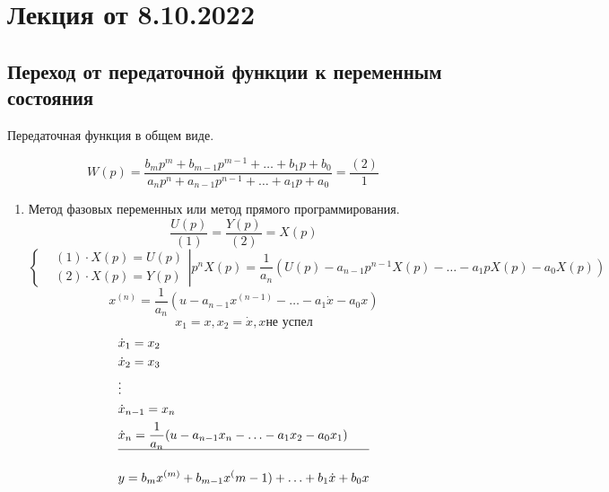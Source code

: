 \section{Лекция от 8.10.2022}
\subsection{Переход от передаточной функции к переменным состояния}
Передаточная функция в общем виде.\par
\[W(p) = \frac{b_mp^m + b_{m-1}p^{m-1} + \ldots + b_1p + b_0}
{a_np^n + a_{n-1}p^{n-1} + \ldots + a_1p +a_0} = \frac{(2)}{1}\]
\begin{enumerate}
	\item Метод фазовых переменных или метод прямого программирования.
		\[\frac{U(p)}{(1)} = \frac{Y(p)}{(2)} = X(p)\]
		\[\left\{\begin{aligned} 
				&(1)\cdot X(p) = U(p)\\
				&(2) \cdot X(p) = Y(p)
				    \end{aligned}\right| p^nX(p) = \frac{1}{a_n}(U(p) - a_{n-1}p^{n-1}X(p) - \ldots - a_1pX(p) - a_0X(p))\]
		\[x^{(n)} = \frac{1}{a_n}(u - a_{n-1}x^{(n-1)} - \ldots - a_1 \dot x - a_0x)\]
		\[x_1 = x, x_2 = \dot x, x \text{не успел}\]
		\[\begin{aligned} 
			&\dot x_1 = x_2\\
			&\dot x_2 = x_3\\
			&\vdots\\
			&\dot x_{n-1} = x_n\\
			&\dot x_n = \frac{1}{a_n}(u - a_{n-1}x_n - \ldots - a_1x_2 - a_0x_1)\\
			\hline\\
			&y =  b_mx^{(m)} + b_{m-1}x^(m-1) + \ldots + b_1\dot x + b_0x
		\end{aligned}\]


\end{enumerate}
